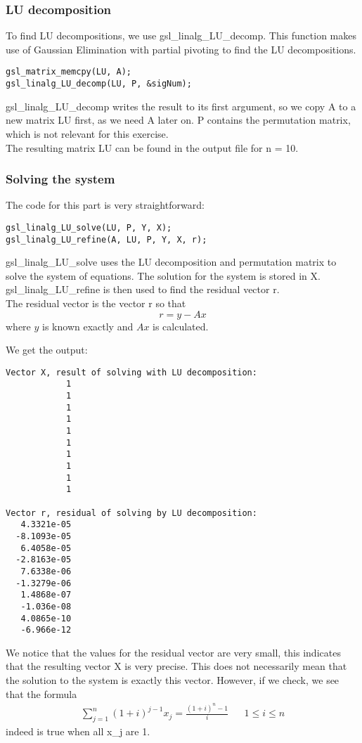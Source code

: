     \subsubsection{LU decomposition}
    To find LU decompositions, we use gsl\_linalg\_LU\_decomp. This function makes use of Gaussian Elimination with partial pivoting to find the LU decompositions.
\begin{lstlisting}
gsl_matrix_memcpy(LU, A);
gsl_linalg_LU_decomp(LU, P, &sigNum);
\end{lstlisting}
    gsl\_linalg\_LU\_decomp writes the result to its first argument, so we copy A to a new matrix
    LU first, as we need A later on. P contains the permutation matrix, which is not relevant for
    this exercise. \\ The resulting matrix LU can be found in the output file for n = 10.

    \subsubsection{Solving the system}
    The code for this part is very straightforward:
\begin{lstlisting}
gsl_linalg_LU_solve(LU, P, Y, X);
gsl_linalg_LU_refine(A, LU, P, Y, X, r);
\end{lstlisting}
    gsl\_linalg\_LU\_solve uses the LU decomposition and permutation matrix to solve the system of equations.
    The solution for the system is stored in X. gsl\_linalg\_LU\_refine is then used to find the residual vector r.\\
    The residual vector is the vector r so that \[ r = y - Ax \] where \(y\) is known exactly and \(Ax\) is calculated. 
    
    We get the output:
\begin{lstlisting}
Vector X, result of solving with LU decomposition:
            1
            1
            1
            1
            1
            1
            1
            1
            1
            1

Vector r, residual of solving by LU decomposition:
   4.3321e-05
  -8.1093e-05
   6.4058e-05
  -2.8163e-05
   7.6338e-06
  -1.3279e-06
   1.4868e-07
   -1.036e-08
   4.0865e-10
   -6.966e-12
\end{lstlisting}
    We notice that the values for the residual vector are very small, this indicates that the resulting
    vector X is very precise. This does not necessarily mean that the solution to the system is exactly this vector.
    However, if we check, we see that the formula
    \[
        \begin{aligned}
            \sum_{j=1}^{n} (1+i)^{j-1} x_j = \frac{(1+i)^{n} - 1}{i}     && 1 \le i \le n
        \end{aligned}
    \]
    indeed is true when all x\_j are 1.

